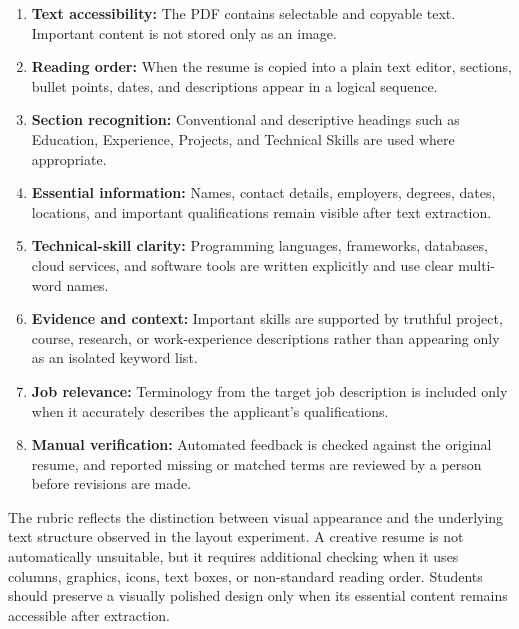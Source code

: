 \documentclass[conference]{IEEEtran}
\begin{document}
\begin{enumerate}
    \item \textbf{Text accessibility:} The PDF contains selectable and
    copyable text. Important content is not stored only as an image.

    \item \textbf{Reading order:} When the resume is copied into a plain
    text editor, sections, bullet points, dates, and descriptions appear
    in a logical sequence.

    \item \textbf{Section recognition:} Conventional and descriptive
    headings such as Education, Experience, Projects, and Technical
    Skills are used where appropriate.

    \item \textbf{Essential information:} Names, contact details,
    employers, degrees, dates, locations, and important qualifications
    remain visible after text extraction.

    \item \textbf{Technical-skill clarity:} Programming languages,
    frameworks, databases, cloud services, and software tools are written
    explicitly and use clear multi-word names.

    \item \textbf{Evidence and context:} Important skills are supported
    by truthful project, course, research, or work-experience
    descriptions rather than appearing only as an isolated keyword list.

    \item \textbf{Job relevance:} Terminology from the target job
    description is included only when it accurately describes the
    applicant's qualifications.

    \item \textbf{Manual verification:} Automated feedback is checked
    against the original resume, and reported missing or matched terms
    are reviewed by a person before revisions are made.
\end{enumerate}

The rubric reflects the distinction between visual appearance and the
underlying text structure observed in the layout experiment. A creative
resume is not automatically unsuitable, but it requires additional
checking when it uses columns, graphics, icons, text boxes, or
non-standard reading order. Students should preserve a visually polished
design only when its essential content remains accessible after
extraction.
\end{document}
